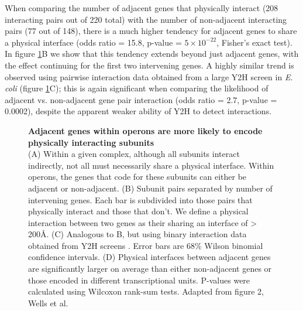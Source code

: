 \documentclass[a4paper,11pt,twoside,openright]{scrbook}
\begin{document}
When comparing the number of adjacent genes that physically interact (208 interacting pairs out of 220 total) with the number of non-adjacent interacting pairs (77 out of 148), there is a much higher tendency for adjacent genes to share a physical interface (odds ratio = 15.8, p-value = \(5\times10^{-22}\), Fisher's exact test). In figure \ref{figure:intervening}B we show that this tendency extends beyond just adjacent genes, with the effect continuing for the first two intervening genes. A highly similar trend is observed using pairwise interaction data obtained from a large Y2H screen in \textit{E. coli} \cite{Rajagopala2014} (figure \ref{figure:intervening}C); this is again significant when comparing the likelihood of adjacent vs. non-adjacent gene pair interaction (odds ratio = 2.7, p-value = 0.0002), despite the apparent weaker ability of Y2H to detect interactions.

\begin{figure}[h]
    \caption[Adjacent genes within operons are more likely to encode physically interacting subunits]{\sffamily \textbf{Adjacent genes within operons are more likely to encode physically interacting subunits} \\ \small (A) Within a given complex, although all subunits interact indirectly, not all must necessarily share a physical interface. Within operons, the genes that code for these subunits can either be adjacent or non-adjacent. (B) Subunit pairs separated by number of intervening genes. Each bar is subdivided into those pairs that physically interact and those that don't. We define a physical interaction between two genes as their sharing an interface of > 200Å. (C) Analogous to B, but using binary interaction data obtained from Y2H screens \cite{Rajagopala2014}. Error bars are 68\% Wilson binomial confidence intervals. (D) Physical interfaces between adjacent genes are significantly larger on average than either non-adjacent genes or those encoded in different transcriptional units. P-values were calculated using Wilcoxon rank-sum tests. Adapted from figure 2, Wells et al. \cite{Wells2016}}
    \label{figure:intervening}
\end{figure}
\end{document}
